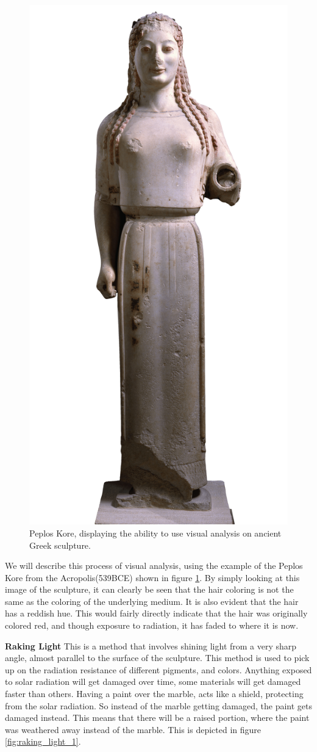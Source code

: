 \documentclass[10pt]{armath}
\begin{document}
\begin{figure}[htpb]
  \centering
  \includegraphics[width=0.4\linewidth]{visual_analysis.png}
  \caption{Peplos Kore, displaying the ability to use visual analysis on
  ancient Greek sculpture.}
  \label{fig:visual_analysis}
\end{figure}

We will describe this process of visual analysis, using the example of the
Peplos Kore from the Acropolis(539BCE) shown in figure \ref{fig:visual_analysis}.
By simply looking at this image of the sculpture, it can clearly be seen that
the hair coloring is not the same as the coloring of the underlying medium. It
is also evident that the hair has a reddish hue. This would fairly directly
indicate that the hair was originally colored red, and though exposure to
radiation, it has faded to where it is now.

\textbf{Raking Light} This is a method that involves shining light from a very
sharp angle, almost parallel to the surface of the sculpture. This method
is used to pick up on the radiation resistance of different pigments, and
colors. Anything exposed to solar radiation will get damaged over time,
some materials will get damaged faster than others. Having a paint over the
marble, acts like a shield, protecting from the solar radiation. So instead
of the marble getting damaged, the paint gets damaged instead. This means
that there will be a raised portion, where the paint was weathered away
instead of the marble. This is depicted in figure \ref{fig:raking_light_1}.
\end{document}
